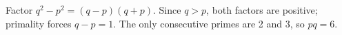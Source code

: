 Factor $ q^2-p^2=(q-p)(q+p)$. Since $ q>p $, both factors are positive; primality forces $ q-p=1 $. The only consecutive primes are 2 and 3, so $\boxed{pq=6}$.
